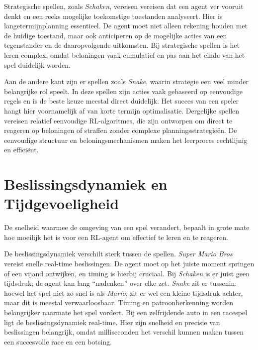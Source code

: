 \documentclass[a4paper,12pt]{report}
\begin{document}
Strategische spellen, zoals \textit{Schaken}, vereisen vereisen dat een agent
ver vooruit denkt en een reeks mogelijke toekomstige toestanden analyseert.
Hier is langetermijnplanning essentieel. De agent moet niet alleen rekening
houden met de huidige toestand, maar ook anticiperen op de mogelijke acties van
een tegenstander en de daaropvolgende uitkomsten. Bij strategische spellen is
het leren complex, omdat beloningen vaak cumulatief en pas aan het einde van
het spel duidelijk worden.

Aan de andere kant zijn er spellen zoals \textit{Snake}, waarin strategie een
veel minder belangrijke rol speelt. In deze spellen zijn acties vaak gebaseerd
op eenvoudige regels en is de beste keuze meestal direct duidelijk. Het succes
van een speler hangt hier voornamelijk af van korte termijn optimalisatie.
Dergelijke spellen vereisen relatief eenvoudige RL-algoritmes, die zijn
ontworpen om direct te reageren op beloningen of straffen zonder complexe
planningsstrategieën. De eenvoudige structuur en beloningsmechanismen maken het
leerproces rechtlijnig en efficiënt.

\section{Beslissingsdynamiek en Tijdgevoeligheid}
De snelheid waarmee de omgeving van een spel verandert, bepaalt in grote mate
hoe moeilijk het is voor een RL-agent om effectief te leren en te reageren.

De beslissingsdynamiek verschilt sterk tussen de spellen. \textit{Super Mario
    Bros} vereist snelle real-time beslissingen. De agent moet op het juiste moment
springen of een vijand ontwijken, en timing is hierbij cruciaal. Bij
\textit{Schaken} is er juist geen tijdsdruk; de agent kan lang “nadenken” over
elke zet. \textit{Snake} zit er tussenin: hoewel het spel niet zo snel is als
\textit{Mario}, zit er wel een kleine tijdsdruk achter, maar dit is meestal
verwaarloosbaar. Timing en patroonherkenning worden belangrijker naarmate het
spel vordert. Bij een zelfrijdende auto in een racespel ligt de
beslissingsdynamiek real-time. Hier zijn snelheid en precisie van beslissingen
belangrijk, omdat milliseconden het verschil kunnen maken tussen een
succesvolle race en een botsing.
\end{document}

